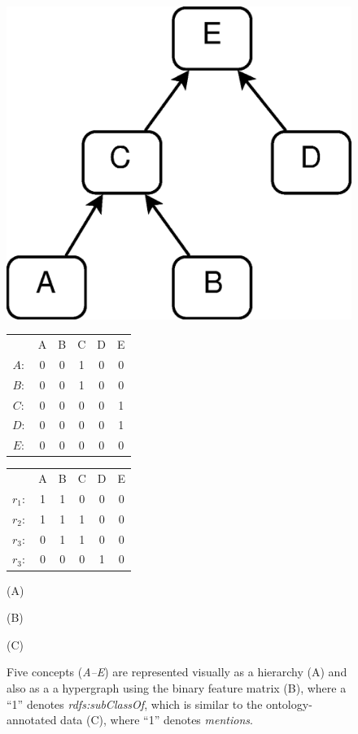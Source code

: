 \begin{figure}[tbh]
\begin{minipage}[c]{.4\textwidth}\centering
\includegraphics[width=.5\linewidth]{fig/simple-onto.eps}
\end{minipage}
\begin{minipage}[c]{.25\textwidth}\centering
    \begin{tabular}{ c | c | c | c | c | c |}
    \cline{2-6}
    	~ & A & B & C & D & E\\
    \cline{2-6}
    $A:$& 0 & 0 & 1 & 0 & 0 \\
    \cline{2-6}
    $B:$& 0 & 0 & 1 & 0 & 0 \\
    \cline{2-6}
    $C:$& 0 & 0 & 0 & 0 & 1 \\
    \cline{2-6}
    $D:$& 0 & 0 & 0 & 0 & 1 \\
    \cline{2-6}
    $E:$& 0 & 0 & 0 & 0 & 0 \\
    \cline{2-6}
    \end{tabular}
\end{minipage}
\begin{minipage}[c]{.25\textwidth}\centering
    \begin{tabular}{ c | c | c | c | c | c |}
    \cline{2-6}
    	~ & A & B & C & D & E\\
    \cline{2-6}
    $r_1:$& 1 & 1 & 0 & 0 & 0 \\
    \cline{2-6}
    $r_2:$& 1 & 1 & 1 & 0 & 0 \\
    \cline{2-6}
    $r_3:$& 0 & 1 & 1 & 0 & 0 \\
    \cline{2-6}
    $r_3:$& 0 & 0 & 0 & 1 & 0 \\
    \cline{2-6}
    \end{tabular}
\end{minipage}
\begin{minipage}[c]{0.4\linewidth}\centering
(A)
\end{minipage}
\begin{minipage}[c]{0.25\linewidth}\centering
(B)
\end{minipage}
\begin{minipage}[c]{0.25\linewidth}\centering
(C)
\end{minipage}
\caption{\label{fig:onto-and-data} Five concepts (\emph{A--E}) are represented visually as a hierarchy (A) and also as a a hypergraph using the binary feature matrix (B), where a ``1'' denotes \emph{rdfs:subClassOf}, which is similar to the ontology-annotated data (C), where ``1'' denotes \emph{mentions}.}
\end{figure}

